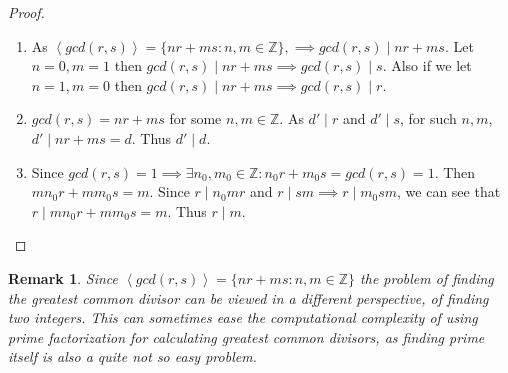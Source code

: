 \documentclass[paper=a4, fontsize=11pt]{scrartcl}
\newcommand{\cyc}[1]{\left< #1 \right>}
\newcommand{\nextline}{$ $ \newline \vspace{-0.15in}}
\newtheorem*{remark}{Remark}
\begin{document}
\begin{proof}
\nextline
\begin{enumerate}
	\item As $\cyc{gcd(r,s)}=\{nr+ms : n,m\in \mathbb{Z} \} , \implies gcd(r,s) \mid nr+ms$. Let $n=0 , m=1$ then $gcd(r,s) \mid nr+ms \implies gcd(r,s) \mid s$. Also if we let $n=1, m=0$ then $gcd(r,s) \mid nr+ms \implies gcd(r,s) \mid r$.
	\item $gcd(r,s)=nr+ms$ for some $n,m \in \mathbb{Z}$. As $d' \mid r$ and $d' \mid s$, for such $n,m$, $d' \mid nr+ms =d$. Thus $d' \mid d$.
	\item Since $gcd(r,s)=1 \implies \exists n_0 , m_0 \in \mathbb{Z}: n_0 r + m_0 s = gcd(r,s)=1$. Then $mn_0 r + mm_0 s =m$. Since $r \mid n_0 m r$ and $r \mid sm \implies r\mid m_0 sm$, we can see that $r \mid mn_0 r + mm_0 s = m$. Thus $r \mid m$.
\end{enumerate}
\end{proof}

\begin{remark}
	Since  $\cyc{gcd(r,s)}=\{nr+ms : n,m\in \mathbb{Z} \} $ the problem of finding the greatest common divisor can be viewed in a different perspective, of finding two integers. This can sometimes ease the computational complexity of using prime factorization for calculating greatest common divisors, as finding prime itself is also a quite not so easy problem.
\end{remark}
\end{document}
